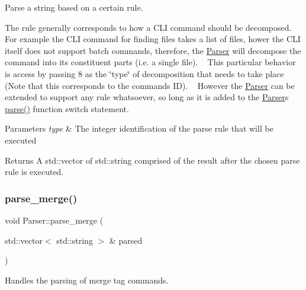 Parse a string based on a certain rule. 

The rule generally corresponds to how a C\+LI command should be decomposed. ~\newline
For example the C\+LI command for finding files takes a list of files, hower the C\+LI itself does not support batch commands, therefore, the \mbox{\hyperlink{class_parser}{Parser}} will decompose the command into its constituent parts (i.\+e. a single file). ~\newline
This particular behavior is access by passing \textquotesingle{}8\textquotesingle{} as the \char`\"{}type\char`\"{} of decomposition that needs to take place (Note that this corresponds to the command\textquotesingle{}s ID). ~\newline
However the \mbox{\hyperlink{class_parser}{Parser}} can be extended to support any rule whatsoever, so long as it is added to the \mbox{\hyperlink{class_parser}{Parser}}\textquotesingle{}s \mbox{\hyperlink{class_parser_a5b531e9ed867eeb8ccb9cb088cf35c24}{parse()}} function switch statement.


\begin{DoxyParams}{Parameters}
{\em type} & The integer identification of the parse rule that will be executed\\
\hline
\end{DoxyParams}
\begin{DoxyReturn}{Returns}
A std\+::vector of std\+::string comprised of the result after the chosen parse rule is executed. 
\end{DoxyReturn}
\mbox{\label{class_parser_a4dff2c17612843df95b4ec6d4e4af847}} 
\subsubsection{\texorpdfstring{parse\+\_\+merge()}{parse\_merge()}}
{\footnotesize\ttfamily void Parser\+::parse\+\_\+merge (\begin{DoxyParamCaption}\item[{std\+::vector$<$ std\+::string $>$ \&}]{parsed }\end{DoxyParamCaption})\hspace{0.3cm}{\ttfamily [private]}}



Handles the parsing of \textquotesingle{}merge tag\textquotesingle{} commands. 

